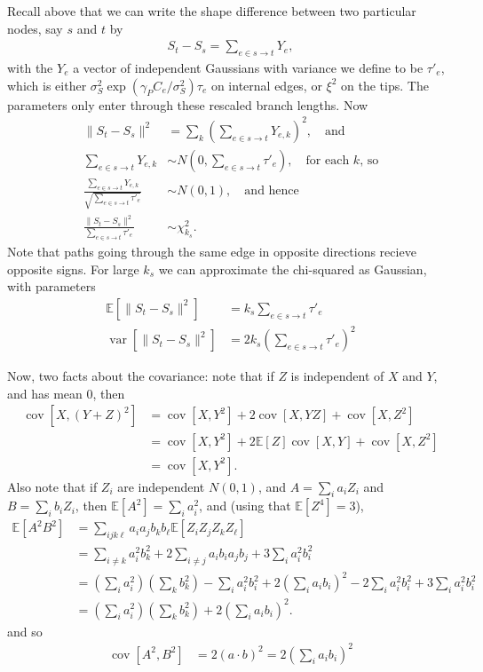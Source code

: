\documentclass{article}
\newcommand{\E}{\mathbb{E}}
\DeclareMathOperator{\cov}{cov}
\DeclareMathOperator{\var}{var}
\begin{document}
Recall above that we can write the shape difference between two particular nodes, 
say $s$ and $t$ by
\begin{align*}
    S_t - S_s = \sum_{e \in s \to t} Y_e ,
\end{align*}
with the $Y_e$ a vector of independent Gaussians with variance we define to be $\tau'_e$, 
which is either $\sigma^2_S \exp\left( \gamma_P C_e /\sigma^2_S \right) \tau_e$ on internal edges, or $\xi^2$ on the tips.
The parameters only enter through these rescaled branch lengths.
Now 
\begin{align}
  \|S_t - S_s\|^2 &= \sum_k \left( \sum_{e \in s \to t} Y_{e,k} \right)^2 , \quad \text{and} \\
  \sum_{e \in s \to t} Y_{e,k} & \sim N(0, \sum_{e \in s \to t} \tau'_e ), \quad \text{for each $k$, so} \\
  \frac{ \sum_{e \in s \to t} Y_{e,k} }{ \sqrt{ \sum_{e \in s \to t} \tau'_e } } &\sim N(0,1), \quad \text{and hence} \\
  \frac{ \|S_t - S_s\|^2 }{  \sum_{e \in s \to t} \tau'_e } &\sim \chi^2_{k_s} .
\end{align}
Note that paths going through the same edge in opposite directions recieve opposite signs.
For large $k_s$ we can approximate the chi-squared as Gaussian,
with parameters
\begin{align*}
    \E[ \|S_t - S_s\|^2 ] &= k_s \sum_{e \in s \to t} \tau'_e \\
    \var[ \|S_t - S_s\|^2 ] &= 2 k_s \left( \sum_{e \in s \to t} \tau'_e \right)^2 
\end{align*}

Now, two facts about the covariance: note that if $Z$ is independent of $X$ and $Y$, and has mean 0, then
\begin{align}
    \cov[X,(Y+Z)^2] &= \cov[X,Y^2] + 2 \cov[X,YZ] + \cov[X, Z^2] \\
    &= \cov[X,Y^2] + 2 \E[Z] \cov[X,Y] + \cov[X,Z^2] \\
    &= \cov[X,Y^2] .
\end{align}
Also note that if $Z_i$ are independent $N(0,1)$, and $A=\sum_i a_i Z_i$ and $B=\sum_i b_i Z_i$,
then $\E[A^2] = \sum_i a_i^2$, and (using that $\E[Z^4] = 3$),
\begin{align}
  \E[A^2 B^2] &= \sum_{ijk\ell} a_i a_j b_k b_\ell \E[Z_i Z_j Z_k Z_\ell] \\
  &= \sum_{i \neq k} a_i^2 b_k^2   %
  + 2 \sum_{i \neq j} a_i b_i a_j b_j   %
  + 3 \sum_i a_i^2 b_i ^2  \\  %
  &= (\sum_i a_i^2)(\sum_k b_k^2) - \sum_i a_i^2 b_i^2 
  + 2 \left( \sum_i a_i b_i \right)^2 - 2 \sum_i a_i^2 b_i^2 
  + 3 \sum_i a_i^2 b_i^2 \\
  &= (\sum_i a_i^2)(\sum_k b_k^2) 
  + 2 \left( \sum_i a_i b_i \right)^2 .
\end{align}
and so
\begin{align}
  \cov[ A^2, B^2 ] &= 2( a \cdot b )^2 = 2( \sum_i a_i b_i )^2 
\end{align}
\end{document}
